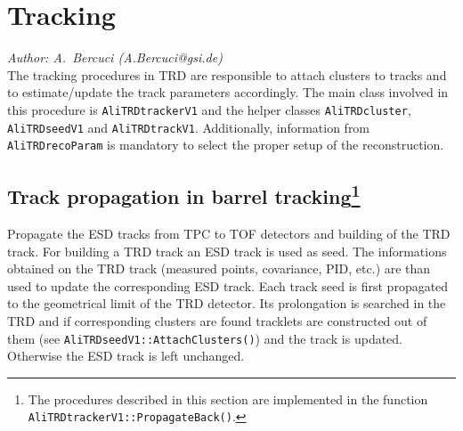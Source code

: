 \documentclass{alicetdr}
\begin{document}
\setcounter{footnote}{0}
\section{Tracking}\label{REC:Tracking:}
{\it Author: A.~Bercuci (A.Bercuci@gsi.de)}\\

The tracking procedures in TRD are responsible to attach clusters to tracks 
and to estimate/update the track parameters accordingly. The main class involved 
in this procedure is {\tt AliTRDtrackerV1} and the helper classes {\tt AliTRDcluster}, 
{\tt AliTRDseedV1} and {\tt AliTRDtrackV1}.  Additionally, information from 
{\tt AliTRDrecoParam} is mandatory to select the proper setup of the reconstruction.
\\

\subsection[Track propagation barrel]{Track propagation in barrel tracking\footnote{The 
procedures described in this section are implemented in the function 
{\tt AliTRDtrackerV1::PropagateBack()}.}}\label{REC:Tracking:Propagate}

Propagate the ESD tracks from TPC to TOF detectors and building of the TRD track. For 
building a TRD track an ESD track is used as seed. The informations obtained on the TRD 
track (measured points, covariance, PID, etc.) are than used to update the corresponding 
ESD track. Each track seed is first propagated to the geometrical limit of the TRD 
detector. Its prolongation is searched in the TRD and if corresponding clusters are found 
tracklets are constructed out of them (see {\tt AliTRDseedV1::AttachClusters()}) and the 
track is updated. Otherwise the ESD track is left unchanged.
\end{document}
